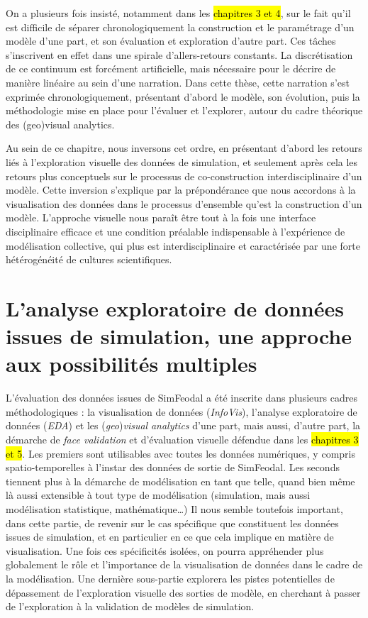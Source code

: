 On a plusieurs fois insisté, notamment dans les \hl{chapitres 3 et 4}, sur le fait qu'il est difficile de séparer chronologiquement la construction et le paramétrage d'un modèle d'une part, et son évaluation et exploration d'autre part.
Ces tâches s'inscrivent en effet dans une spirale d'allers-retours constants.
La discrétisation de ce continuum est forcément artificielle, mais nécessaire pour le décrire de manière linéaire au sein d'une narration.
Dans cette thèse, cette narration s'est exprimée chronologiquement, présentant d'abord le modèle, son évolution, puis la méthodologie mise en place pour l'évaluer et l'explorer, autour du cadre théorique des (geo)visual analytics.

Au sein de ce chapitre, nous inversons cet ordre, en présentant d'abord les retours liés à l'exploration visuelle des données de simulation, et seulement après cela les retours plus conceptuels sur le processus de co-construction interdisciplinaire d'un modèle.
Cette inversion s'explique par la prépondérance que nous accordons à la visualisation des données dans le processus d'ensemble qu'est la construction d'un modèle.
L'approche visuelle nous paraît être tout à la fois une interface disciplinaire efficace et une condition préalable indispensable à l'expérience de modélisation collective, qui plus est interdisciplinaire et caractérisée par une forte hétérogénéité de cultures scientifiques.

\clearpage
\let\orisectionmark\sectionmark
\renewcommand\sectionmark[1]{}%
\section{L'analyse exploratoire de données issues de simulation, une approche aux possibilités multiples}
\orisectionmark{Retour sur l'analyse de données de simulation}
\let\sectionmark\orisectionmark

L'évaluation des données issues de SimFeodal a été inscrite dans plusieurs cadres méthodologiques :
la visualisation de données (\textit{InfoVis}), l'analyse exploratoire de données (\textit{EDA}) et les (\textit{geo})\textit{visual} \textit{analytics} d'une part, mais aussi, d'autre part, la démarche de \textit{face validation} et d'évaluation visuelle défendue dans les \hl{chapitres 3 et 5}.
Les premiers sont utilisables avec toutes les données numériques, y compris spatio-temporelles à l'instar des données de sortie de SimFeodal.
Les seconds tiennent plus à la démarche de modélisation en tant que telle, quand bien même là aussi extensible à tout type de modélisation (simulation, mais aussi modélisation statistique, mathématique\ldots)
Il nous semble toutefois important, dans cette partie, de revenir sur le cas spécifique que constituent les données issues de simulation, et en particulier en ce que cela implique en matière de visualisation.
Une fois ces spécificités isolées, on pourra appréhender plus globalement le rôle et l'importance de la visualisation de données dans le cadre de la modélisation.
Une dernière sous-partie explorera les pistes potentielles de dépassement de l'exploration visuelle des sorties de modèle, en cherchant à passer de l'exploration à la validation de modèles de simulation.


